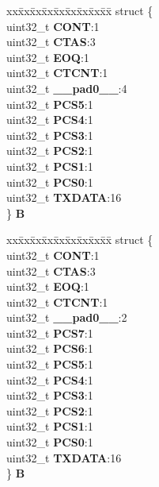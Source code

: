 \begin{DoxyCompactItemize}
\begin{tabbing}
\end{tabbing}\item 
\mbox{\label{unionDSPI__tag_1_1DSPI__PUSHR__tag_a91833dc5448f6426da2a2db907845bd7}} 
\begin{tabbing}
xx\=xx\=xx\=xx\=xx\=xx\=xx\=xx\=xx\=\kill
struct \{\\
\>uint32\_t {\bfseries CONT}:1\\
\>uint32\_t {\bfseries CTAS}:3\\
\>uint32\_t {\bfseries EOQ}:1\\
\>uint32\_t {\bfseries CTCNT}:1\\
\>uint32\_t {\bfseries \_\_pad0\_\_}:4\\
\>uint32\_t {\bfseries PCS5}:1\\
\>uint32\_t {\bfseries PCS4}:1\\
\>uint32\_t {\bfseries PCS3}:1\\
\>uint32\_t {\bfseries PCS2}:1\\
\>uint32\_t {\bfseries PCS1}:1\\
\>uint32\_t {\bfseries PCS0}:1\\
\>uint32\_t {\bfseries TXDATA}:16\\
\} {\bfseries B}\\

\end{tabbing}\item 
\mbox{\label{unionDSPI__tag_1_1DSPI__PUSHR__tag_a1324d273b5d52c7512eb6ca2bd50d006}} 
\begin{tabbing}
xx\=xx\=xx\=xx\=xx\=xx\=xx\=xx\=xx\=\kill
struct \{\\
\>uint32\_t {\bfseries CONT}:1\\
\>uint32\_t {\bfseries CTAS}:3\\
\>uint32\_t {\bfseries EOQ}:1\\
\>uint32\_t {\bfseries CTCNT}:1\\
\>uint32\_t {\bfseries \_\_pad0\_\_}:2\\
\>uint32\_t {\bfseries PCS7}:1\\
\>uint32\_t {\bfseries PCS6}:1\\
\>uint32\_t {\bfseries PCS5}:1\\
\>uint32\_t {\bfseries PCS4}:1\\
\>uint32\_t {\bfseries PCS3}:1\\
\>uint32\_t {\bfseries PCS2}:1\\
\>uint32\_t {\bfseries PCS1}:1\\
\>uint32\_t {\bfseries PCS0}:1\\
\>uint32\_t {\bfseries TXDATA}:16\\
\} {\bfseries B}\\

\end{tabbing}\end{DoxyCompactItemize}


